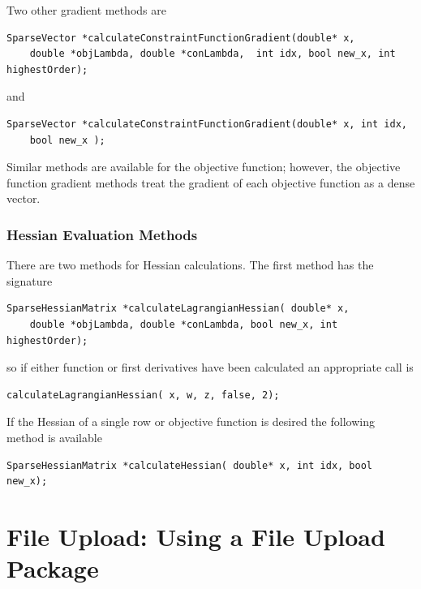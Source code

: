 \documentclass[11pt]{article}
\renewcommand{\_}{{\char"5F}}
\renewcommand{\{}{{\char"7B}}
\renewcommand{\}}{{\char"7D}}
\renewcommand{\^}{{\char"0D}}
\renewcommand{\'}{{\char"0D}}
\begin{document}
\begin{enumerate}[Step 1:]
Two other gradient methods are
\begin{verbatim}
SparseVector *calculateConstraintFunctionGradient(double* x,
    double *objLambda, double *conLambda,  int idx, bool new_x, int highestOrder);
\end{verbatim}
and
\begin{verbatim}
SparseVector *calculateConstraintFunctionGradient(double* x, int idx,
    bool new_x );
\end{verbatim}

Similar methods are available for the objective function; however, the objective function gradient methods treat the gradient of each objective function as a dense vector.


\subsubsection{Hessian Evaluation Methods}

There are two methods for Hessian calculations.  The first method has the signature
\begin{verbatim}
SparseHessianMatrix *calculateLagrangianHessian( double* x,
    double *objLambda, double *conLambda, bool new_x, int highestOrder);
\end{verbatim}
so if either function or first derivatives have been calculated an appropriate call is
\begin{verbatim}
calculateLagrangianHessian( x, w, z, false, 2);
\end{verbatim}
If the Hessian of a single row or objective function is desired the following method is available
\begin{verbatim}
SparseHessianMatrix *calculateHessian( double* x, int idx, bool new_x);
\end{verbatim}











\section{File Upload:  Using a File Upload Package}\label{section:fileupload}


\end{enumerate}
\end{document}
